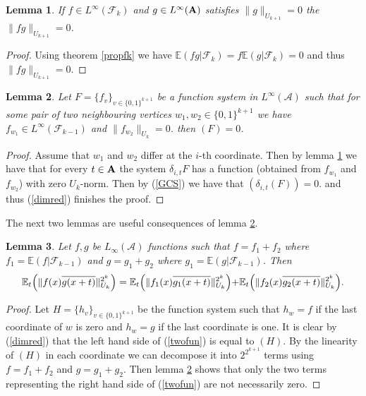 \documentclass [11pt] {article}
\newtheorem{lemma}{Lemma}[section]
\def\bA{{\bf A}}
\begin{document}
\begin{lemma}\label{szorzat} If $f\in L^\infty(\mathcal{F}_k)$ and $g\in L^\infty(\bA)$ satisfies $\|g\|_{U_{k+1}}=0$ the $\|fg\|_{U_{k+1}}=0$.
\end{lemma}

\begin{proof} Using theorem \ref{propfk} we have  $\mathbb{E}(fg|\mathcal{F}_k)=f\mathbb{E}(g|\mathcal{F}_k)=0$ and thus $\|fg\|_{U_{k+1}}=0$.
\end{proof}

\begin{lemma}\label{szomszed} Let $F=\{f_v\}_{v\in \{0,1\}^{k+1}}$ be a function system in $L^\infty(\mathcal{A})$ such that for some pair of two neighbouring vertices $w_1,w_2\in \{0,1\}^{k+1}$ we have $f_{w_1}\in L^\infty(\mathcal{F}_{k-1})$ and $\|f_{w_2}\|_{U_k}=0$. then $(F)=0$.
\end{lemma}

\begin{proof} Assume that $w_1$ and $w_2$ differ at the $i$-th coordinate. Then by lemma \ref{szorzat} we have that for every $t\in\bA$ the system $\delta_{i,t} F$ has a function (obtained from $f_{w_1}$ and $f_{w_2}$) with zero $U_k$-norm. Then by (\ref{GCS}) we have that $(\delta_{i,t}(F))=0$. and thus (\ref{dimred}) finishes the proof. 
\end{proof}

The next two lemmas are useful consequences of lemma \ref{szomszed}. 

\begin{lemma}\label{twofunct} Let $f,g$ be $L_\infty(\mathcal{A})$ functions such that $f=f_1+f_2$ where $f_1=\mathbb{E}(f|\mathcal{F}_{k-1})$ and $g=g_1+g_2$ where $g_1=\mathbb{E}(g|\mathcal{F}_{k-1})$. Then
\begin{equation}\label{twofun} \mathbb{E}_t\Bigl(\|f(x)\overline{g(x+t)}\|^{2^k}_{U_k}\Bigr)=\mathbb{E}_t\Bigl(\|f_1(x)\overline{g_1(x+t)}\|^{2^k}_{U_k}\Bigl)+\mathbb{E}_t\Bigr(\|f_2(x)\overline{g_2(x+t)}\|^{2^k}_{U_k}\Bigr).
\end{equation}
\end{lemma}

\begin{proof} Let $H=\{h_v\}_{v\in\{0,1\}^{k+1}}$ be the function system such that $h_w=f$ if the last coordinate of $w$ is zero and $h_w=g$ if the last coordinate is one. It is clear by (\ref{dimred}) that the left hand side of (\ref{twofun}) is equal to $(H)$. By the linearity of $(H)$ in each coordinate we can decompose it into $2^{2^{k+1}}$ terms using $f=f_1+f_2$ and $g=g_1+g_2$. Then lemma \ref{szomszed} shows that only the two terms representing the right hand side of (\ref{twofun}) are not necessarily zero.
\end{proof}
\end{document}
